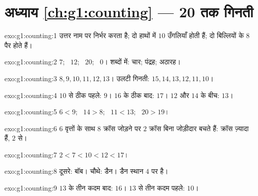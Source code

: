 \section*{अध्याय \ref{ch:g1:counting} --- 20 तक गिनती}

\begin{solution}{exo:g1:counting:1}
उत्तर नाम पर निर्भर करता है; दो हाथों में $10$ उँगलियाँ होती हैं;
दो बिल्लियों के $8$ पैर होते हैं।
\end{solution}

\begin{solution}{exo:g1:counting:2}
$7$; \ $12$; \ $20$; \ $0$। शब्दों में: चार; पंद्रह; अठारह।
\end{solution}

\begin{solution}{exo:g1:counting:3}
$8, 9, 10, 11, 12, 13$। उलटी गिनती: $15, 14, 13, 12, 11, 10$।
\end{solution}

\begin{solution}{exo:g1:counting:4}
$10$ से ठीक पहले: $9$। $16$ के ठीक बाद: $17$। $12$ और
$14$ के बीच: $13$।
\end{solution}

\begin{solution}{exo:g1:counting:5}
$6 < 9$; \ $14 > 8$; \ $11 < 13$; \ $20 > 19$।
\end{solution}

\begin{solution}{exo:g1:counting:6}
$6$ वृत्तों के साथ $8$ क्रॉस जोड़ने पर $2$ क्रॉस बिना जोड़ीदार
बचते हैं: क्रॉस ज़्यादा हैं, $2$ से।
\end{solution}

\begin{solution}{exo:g1:counting:7}
$2 < 7 < 10 < 12 < 17$।
\end{solution}

\begin{solution}{exo:g1:counting:8}
दूसरे: बॉब। चौथे: डैन। डैन स्थान $4$ पर है।
\end{solution}

\begin{solution}{exo:g1:counting:9}
$13$ के तीन कदम बाद: $16$। $13$ से तीन कदम पहले: $10$।
\end{solution}
